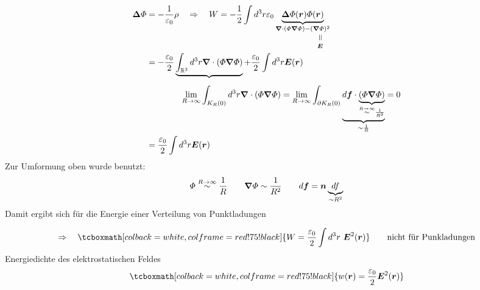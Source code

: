 \documentclass[titlepage,11pt,a4paper,ngerman]{report}
\newcommand{\ub}[1]{\underbrace{#1}}
\newcommand{\verteq}{\rotatebox{90}{$\,=$}}
\newcommand{\equalto}[2]{\underset{\scriptstyle\overset{\mkern4mu\verteq}{#2}}{#1}}
\renewcommand{\Phi}{\varPhi}
\renewcommand{\vec}[1]{\boldsymbol{#1}}
\renewcommand{\epsilon}{\varepsilon}
\newcommand{\rmbox}[1]{\tcboxmath[colback=white,colframe=red!75!black]{#1}}
\begin{document}
\begin{align*}
\vec\Delta \Phi &= - \frac{1}{\epsilon_0} \rho \quad \Rightarrow \quad W = -\frac{1}{2} \int d^3r \epsilon_0 \ub{\vec\Delta \Phi(\vec{r}) \Phi(\vec{r})}_{\vec{\nabla} \cdot (\Phi \vec{\nabla} \Phi) - \equalto{(\vec{\nabla} \Phi)^2}{\vec{E}} }\\
&= -\frac{\epsilon_0}{2} \ub{\int_{\mathbb{R}^3} d^3r \vec{\nabla} \cdot (\Phi \vec{\nabla} \Phi)} + \frac{\epsilon_0}{2} \int d^3r \vec{E}(\vec{r})\\[5pt]
& \qquad \qquad \lim\limits_{R\to \infty} \int_{K_R(0)} d^3r \vec{\nabla} \cdot (\Phi \vec{\nabla} \Phi) = \lim\limits_{R \to \infty} \int_{\partial K_R(0)} \ub{d\vec{f} \cdot \ub{(\Phi \vec{\nabla}\Phi)}_{\buildrel {R\to \infty} \over \sim \frac{1}{R^3}}}_{\sim \frac{1}{R}} = 0\\
&= \frac{\epsilon_0}{2} \int d^3r \vec{E}(\vec{r})
\end{align*}
Zur Umformung oben wurde benutzt:
\begin{equation*}
\Phi \buildrel R\to \infty \over \sim \frac{1}{R} \qquad \vec{\nabla} \Phi \sim \frac{1}{R^2}\qquad d\vec{f} = \vec{n} \ub{df}_{\sim R^2}
\end{equation*}
Damit ergibt sich für die Energie einer Verteilung von Punktladungen 


$$\Rightarrow \quad \rmbox{W = \frac{\epsilon_0}{2} \int d^3 r\ \vec{E}^2(\vec{r})} \qquad \textrm{nicht für Punkladungen}$$
Energiedichte des elektrostatischen Feldes
$$\rmbox{w(\vec{r}) = \frac{\epsilon_0}{2} \vec{E}^2(\vec{r})}$$
\end{document}
